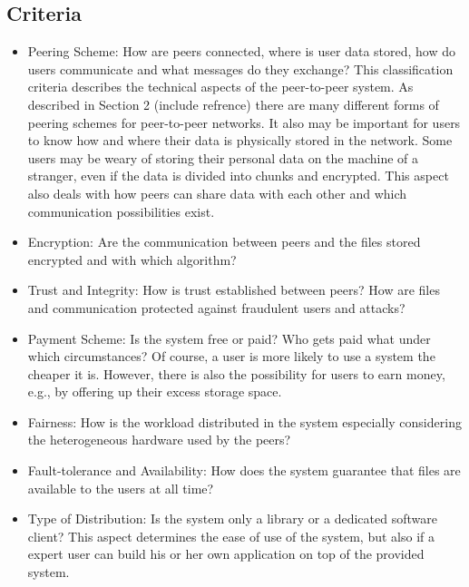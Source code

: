 \subsection{Criteria}
\begin{itemize}
\item Peering Scheme: How are peers connected, where is user data stored, how do users communicate and what messages do they exchange?
This classification criteria describes the technical aspects of the peer-to-peer system. As described in Section 2 (include refrence) there are many different forms of peering schemes for peer-to-peer networks. It also may be important for users to know how and where their data is physically stored in the network. Some users may be weary of storing their personal data on the machine of a stranger, even if the data is divided into chunks and encrypted. This aspect also deals with how peers can share data with each other and which communication possibilities exist. 

\item Encryption: Are the communication between peers and the files stored encrypted and with which algorithm?

\item Trust and Integrity: How is trust established between peers? How are files and communication protected against fraudulent users and attacks?

\item Payment Scheme: Is the system free or paid? Who gets paid what under which circumstances?
Of course, a user is more likely to use a system the cheaper it is. However, there is also the possibility for users to earn money, e.g., by offering up their excess storage space.

\item Fairness: How is the workload distributed in the system especially considering the heterogeneous hardware used by the peers?

\item Fault-tolerance and Availability: How does the system guarantee that files are available to the users at all time?

\item Type of Distribution: Is the system only a library or a dedicated software client?
This aspect determines the ease of use of the system, but also if a expert user can build his or her own application on top of the provided system.


\end{itemize}
